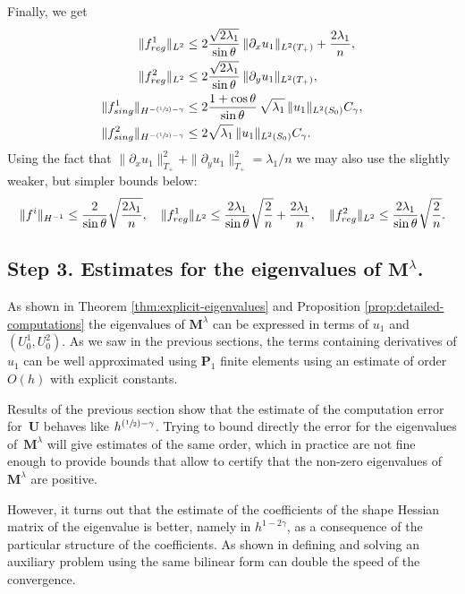 \documentclass[11pt]{article}
\numberwithin{equation}{section}\newtheorem*{jepEnonce}{\jepEnonceTitle}\newenvironment{enonce*}[1]{\def\jepEnonceTitle{#1}\jepEnonce}{\endjepEnonce}\newtheorem*{conj*}{Conjecture}
\newcommand{\Psfrac}[2]{(\sfrac{#1}{#2})}
\theoremstyle{plain}
\theoremstyle{definition}
\newcommand{\bo}[1]{{\boldsymbol#1}}
\newcommand{\reg}{\textup{reg}}
\newcommand{\sing}{\textup{sing}}
\newcommand{\lb}{\lambda}
\let\jepOriginalSfrac\sfrac
\renewcommand{\sfrac}[2]{{\jepOriginalSfrac{#1}{#2}}}
\begin{document}
Finally, we get
\begin{align*}
\|f^1_{\reg}\|_{L^2} &\leq 2\frac{\sqrt{2\lambda_1}}{\sin \theta}\, \|\partial_x u_1\|_{L^2(T_+)}+\frac{2\lambda_1}{n},\\
\|f^2_{\reg}\|_{L^2} &\leq 2\frac{\sqrt{2\lambda_1}}{\sin \theta}\,\|\partial_y u_1\|_{L^2(T_+)},\\
\|f^1_{\sing}\|_{H^{-\Psfrac 12-\gamma}} &\le 2 \frac{1+ \cos \theta}{ \sin \theta}\, \sqrt{ \lb_1 }\, \|u_1\|_{L^2(S_0)}C_\gamma,\\
\|f^2_{\sing}\|_{H^{-\Psfrac 12-\gamma}} &\le 2 \sqrt{ \lb_1 }\, \|u_1 \|_{L^2(S_0)}C_\gamma.
\end{align*}
Using the fact that $\|\partial_x u_1\|_{T_+}^2+ \|\partial_y u_1\|_{T_+}^2 = \lambda_1/n$ we may also use the slightly weaker, but simpler bounds below:
\[
\|f^i\|_{H^{-1}} \leq \frac{2 }{\sin\theta } \sqrt{\frac{2\lambda_1}{n}},\quad
\|f^1_{\reg}\|_{L^2} \leq \frac{2\lambda_1}{\sin \theta}\sqrt{\frac{2}{n}}+\frac{2\lambda_1}{n},\quad
\|f^2_{\reg}\|_{L^2} \leq \frac{2\lambda_1}{\sin \theta}\sqrt{\frac{2}{n}}.
\]

\subsection{Step 3. Estimates for the eigenvalues of $\bo M^\lb$.}
\label{sec:estimates-coeffs}
As shown in Theorem \ref{thm:explicit-eigenvalues} and Proposition \ref{prop:detailed-computations} the eigenvalues of $\bo M^\lambda$ can be expressed in terms of $u_1$ and $(U_0^1,U_0^2)$. As we saw in the previous sections, the terms containing derivatives of $u_1$ can be well approximated using $\bo P_1$ finite elements using an estimate of order $O(h)$ with explicit constants.

Results of the previous section show that the estimate of the computation error for~$\bo U$ behaves like $h^{\Psfrac 12 -\gamma}$. Trying to bound directly the error for the eigenvalues of~$\bo M^\lambda$ will give estimates of the same order, which in practice are not fine enough to provide bounds that allow to certify that the non-zero eigenvalues of $\bo M^\lambda$ are positive.

However, it turns out that the estimate of the coefficients of the shape Hessian matrix of the eigenvalue is better, namely in $h^{1-2\gamma}$, as a consequence of the particular structure of the coefficients. As shown in \cite[\S 5]{approximation-trick} defining and solving an auxiliary problem using the same bilinear form can double the speed of the convergence.
\end{document}
